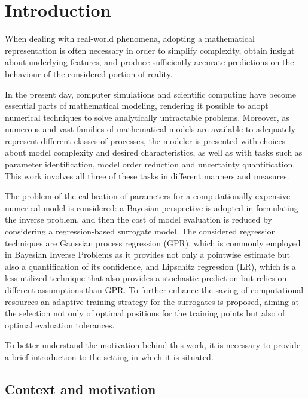 \section{Introduction} \label{sec:intro}

When dealing with real-world phenomena, adopting a mathematical representation is often necessary in order to simplify complexity, obtain insight about underlying features, and produce sufficiently accurate predictions on the behaviour of the considered portion of reality. 

In the present day, computer simulations and scientific computing have become essential parts of mathematical modeling, rendering it possible to adopt numerical techniques to solve analytically untractable problems.
Moreover, as numerous and vast families of mathematical models are available to adequately represent different classes of processes, the modeler is presented with choices about model complexity and desired characteristics, as well as with tasks such as parameter identification, model order reduction and uncertainty quantification. 
This work involves all three of these tasks in different manners and measures. 

The problem of the calibration of parameters for a computationally expensive numerical model is considered: a Bayesian perspective is adopted in formulating the inverse problem, and then the cost of model evaluation is reduced by considering a regression-based surrogate model.
The considered regression techniques are Gaussian process regression (GPR), which is commonly employed in Bayesian Inverse Problems as it provides not only a pointwise estimate but also a quantification of its confidence, and Lipschitz regression (LR), which is a less utilized technique that also provides a stochastic prediction but relies on different assumptions than GPR. 
To further enhance the saving of computational resources an adaptive training strategy for the surrogates is proposed, aiming at the selection not only of optimal positions for the training points but also of optimal evaluation tolerances.

To better understand the motivation behind this work, it is necessary to provide a brief introduction to the setting in which it is situated.

\subsection{Context and motivation}\label{sec:context}

